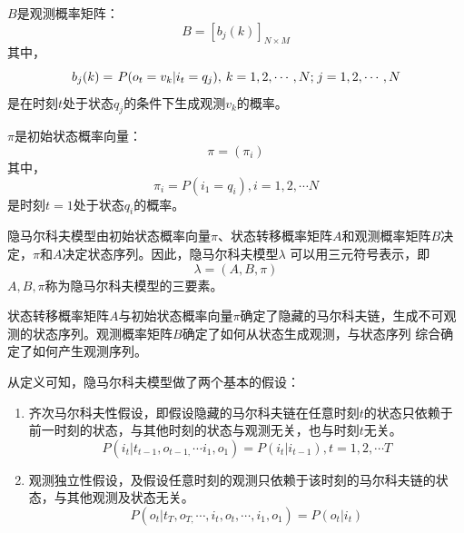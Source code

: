     $B$是观测概率矩阵：
    \begin{equation}
    B = {\left[ {{b_{j}(k)}} \right]_{N \times M}}
    \end{equation}
    其中，
    \begin{equation}
    {b_{j}(k)} = {\kern 1pt} P({o_t} = {v_k}|{i_t} = {q_j}),{\kern 1pt} {\kern 1pt} k = 1,2, \cdots ,N;{\kern 1pt} j = 1,2, \cdots ,N
    \end{equation}
    是在时刻$t$处于状态$q_j$的条件下生成观测$v_k$的概率。

    $\pi$是初始状态概率向量：
    \begin{equation}
    \pi  = ({\pi _i})
    \end{equation}
    其中，
    \begin{equation}
    {\pi _i} = P({i_1} = {q_i}),i = 1,2, \cdots N
    \end{equation}
    是时刻$t=1$处于状态$q_i$的概率。

    隐马尔科夫模型由初始状态概率向量$\pi$、状态转移概率矩阵$A$和观测概率矩阵$B$决定，$\pi$和$A$决定状态序列。因此，隐马尔科夫模型$\lambda $
    可以用三元符号表示，即
    \begin{equation}
    \lambda  = \left( {A,B,\pi } \right)
    \end{equation}
    ${A,B,\pi }$称为隐马尔科夫模型的三要素。

    状态转移概率矩阵$A$与初始状态概率向量$\pi$确定了隐藏的马尔科夫链，生成不可观测的状态序列。观测概率矩阵$B$确定了如何从状态生成观测，与状态序列
    综合确定了如何产生观测序列。

    从定义可知，隐马尔科夫模型做了两个基本的假设：
    \begin{enumerate}
    	\item 齐次马尔科夫性假设，即假设隐藏的马尔科夫链在任意时刻$t$的状态只依赖于前一时刻的状态，与其他时刻的状态与观测无关，也与时刻$t$无关。
            \begin{equation}
            P({i_t}|{t_{t - 1}},{o_{t - 1,}} \cdots {i_1},{o_1}) = P({i_t}|{i_{t - 1}}),t = 1,2, \cdots T
            \end{equation}
        \item 观测独立性假设，及假设任意时刻的观测只依赖于该时刻的马尔科夫链的状态，与其他观测及状态无关。
            \begin{equation}
            P({o_t}|{t_T},{o_{T,}} \cdots ,{i_t},{o_t}, \cdots ,{i_1},{o_1}) = P({o_t}|{i_t})
            \end{equation}
    \end{enumerate}

